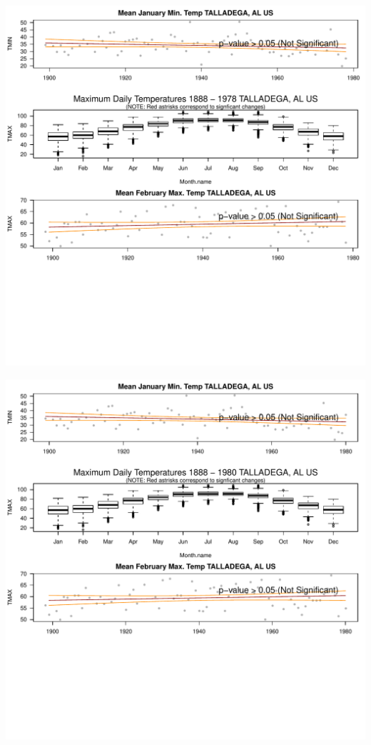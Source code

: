 \documentclass{article}\usepackage[]{graphicx}\usepackage[]{color}
\makeatletter
\def\maxwidth{ %
  \ifdim\Gin@nat@width>\linewidth
    \linewidth
  \else
    \Gin@nat@width
  \fi
}
\newenvironment{knitrout}{}{} %
\makeatother
\begin{document}
\begin{knitrout}
\includegraphics[width=\maxwidth]{figure/static_template-35} 

\includegraphics[width=\maxwidth]{figure/static_template-36} 


\end{knitrout}
\end{document}
